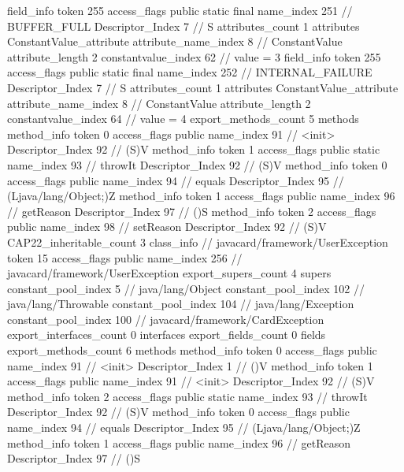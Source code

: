 {{{{{{{				}
				}
			}
			field_info {
				token	255
				access_flags	public static final
				name_index	251		// BUFFER_FULL
				Descriptor_Index	7		// S
				attributes_count	1
				attributes {
				ConstantValue_attribute {
					attribute_name_index	8		// ConstantValue
					attribute_length	2
					constantvalue_index	62		// value = 3
				}
				}
			}
			field_info {
				token	255
				access_flags	public static final
				name_index	252		// INTERNAL_FAILURE
				Descriptor_Index	7		// S
				attributes_count	1
				attributes {
				ConstantValue_attribute {
					attribute_name_index	8		// ConstantValue
					attribute_length	2
					constantvalue_index	64		// value = 4
				}
				}
			}
			}
			export_methods_count	5
			methods {
				method_info {
					token	0
					access_flags	public
					name_index	91		// <init>
					Descriptor_Index	92		// (S)V
				}
				method_info {
					token	1
					access_flags	public static
					name_index	93		// throwIt
					Descriptor_Index	92		// (S)V
				}
				method_info {
					token	0
					access_flags	public
					name_index	94		// equals
					Descriptor_Index	95		// (Ljava/lang/Object;)Z
				}
				method_info {
					token	1
					access_flags	public
					name_index	96		// getReason
					Descriptor_Index	97		// ()S
				}
				method_info {
					token	2
					access_flags	public
					name_index	98		// setReason
					Descriptor_Index	92		// (S)V
				}
			}
			CAP22_inheritable_count	3
		}
		class_info {		// javacard/framework/UserException
			token	15
			access_flags	public
			name_index	256		// javacard/framework/UserException
			export_supers_count	4
			supers {
				constant_pool_index	5		// java/lang/Object
				constant_pool_index	102		// java/lang/Throwable
				constant_pool_index	104		// java/lang/Exception
				constant_pool_index	100		// javacard/framework/CardException
			}
			export_interfaces_count	0
			interfaces {
			}
			export_fields_count	0
			fields {
			}
			export_methods_count	6
			methods {
				method_info {
					token	0
					access_flags	public
					name_index	91		// <init>
					Descriptor_Index	1		// ()V
				}
				method_info {
					token	1
					access_flags	public
					name_index	91		// <init>
					Descriptor_Index	92		// (S)V
				}
				method_info {
					token	2
					access_flags	public static
					name_index	93		// throwIt
					Descriptor_Index	92		// (S)V
				}
				method_info {
					token	0
					access_flags	public
					name_index	94		// equals
					Descriptor_Index	95		// (Ljava/lang/Object;)Z
				}
				method_info {
					token	1
					access_flags	public
					name_index	96		// getReason
					Descriptor_Index	97		// ()S
}}}}}
